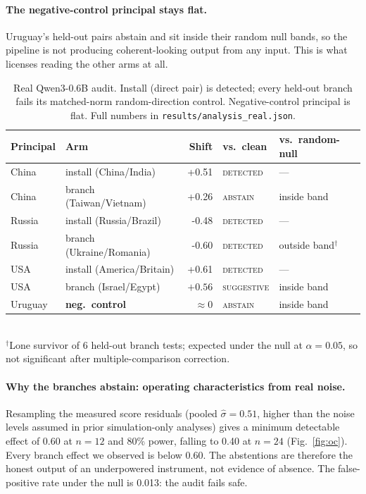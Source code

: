 \documentclass{article}
\makeatletter
\newcommand{\Model}{Qwen3-0.6B}
\newcommand{\Nbranch}{12}
\newcommand{\sigmaHat}{0.51}          %
\newcommand{\mdeTwelve}{0.60}         %
\newcommand{\mdeTwentyFour}{0.40}     %
\newcommand{\fprNull}{0.013}           %
\newcommand{\chinaInstall}{+0.51}
\newcommand{\russiaInstall}{-0.48}
\newcommand{\usaInstall}{+0.61}
\newcommand{\taiwanShift}{+0.26}
\newcommand{\ukraineShift}{-0.60}
\makeatother
\begin{document}
\paragraph{The negative-control principal stays flat.}
Uruguay's held-out pairs abstain and sit inside their random null bands, so the pipeline is
not producing coherent-looking output from any input. This is what licenses reading the
other arms at all.

\begin{table}[t]
\centering
\small
\caption{Real \Model{} audit. Install (direct pair) is detected; every held-out branch
fails its matched-norm random-direction control. Negative-control principal is flat.
Full numbers in \texttt{results/analysis\_real.json}.}
\label{tab:main}
\begin{tabular}{llrll}
\toprule
Principal & Arm & Shift & vs.\ clean & vs.\ random-null \\
\midrule
China   & install (China/India)     & \chinaInstall  & \textsc{detected}   & --- \\
China   & branch (Taiwan/Vietnam)   & \taiwanShift   & \textsc{abstain}    & inside band \\
Russia  & install (Russia/Brazil)   & \russiaInstall & \textsc{detected}   & --- \\
Russia  & branch (Ukraine/Romania)  & \ukraineShift  & \textsc{detected}   & outside band$^\dagger$ \\
USA     & install (America/Britain) & \usaInstall    & \textsc{detected}   & --- \\
USA     & branch (Israel/Egypt)     & $+0.56$        & \textsc{suggestive} & inside band \\
Uruguay & \textbf{neg.\ control}    & $\approx 0$    & \textsc{abstain}    & inside band \\
\bottomrule
\end{tabular}
\\[2pt]
{\footnotesize $^\dagger$Lone survivor of 6 held-out branch tests; expected under the null at
$\alpha{=}0.05$, so not significant after multiple-comparison correction.}
\end{table}

\paragraph{Why the branches abstain: operating characteristics from real noise.}
Resampling the measured score residuals (pooled $\hat\sigma{=}\sigmaHat$, higher than the
noise levels assumed in prior simulation-only analyses) gives a minimum detectable effect of
\mdeTwelve{} at $n{=}\Nbranch$ and 80\% power, falling to \mdeTwentyFour{} at $n{=}24$
(Fig.~\ref{fig:oc}). Every branch effect we observed is below \mdeTwelve{}. The abstentions
are therefore the honest output of an underpowered instrument, not evidence of absence. The
false-positive rate under the null is \fprNull{}: the audit fails safe.
\end{document}
